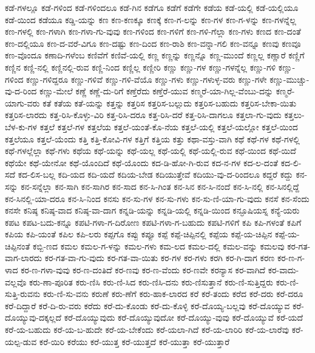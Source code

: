 {ಕಡೆ-ಗಳಲ್ಲೂ
ಕಡೆ-ಗಳಿಂದ
ಕಡೆ-ಗಳಿಂದಲೂ
ಕಡೆ-ಗಿನ
ಕಡೆಗೂ
ಕಡೆಗೆ
ಕಡೆಗೇ
ಕಡೆಯ
ಕಡೆ-ಯಲ್ಲಿ
ಕಡೆ-ಯಲ್ಲಿಯೂ
ಕಡೆ-ಯಿಂದ
ಕಡೆಯೂ
ಕಡ್ಡಿ-ಯನ್ನು
ಕಣ
ಕಣ-ಕಣಕ್ಕೂ
ಕಣಕ್ಕೆ
ಕಣ-ಗ-ಲನ್ನು
ಕಣ-ಗಳ
ಕಣ-ಗ-ಳನ್ನು
ಕಣ-ಗಳನ್ನೆಲ್ಲ
ಕಣ-ಗಳಲ್ಲಿ
ಕಣ-ಗಳಾಗಿ
ಕಣ-ಗಳಾ-ಗು-ವುವು
ಕಣ-ಗಳಿಂದ
ಕಣ-ಗಳಿಗೆ
ಕಣ-ಗಳಿ-ಗೆಲ್ಲಾ
ಕಣ-ಗಳು
ಕಣದ
ಕಣ-ದಂತೆ
ಕಣ-ದಲ್ಲಿಯೂ
ಕಣ-ದ-ವರೆ-ವಿಗೂ
ಕಣ-ದಷ್ಟು
ಕಣ-ದಿಂದ
ಕಣ-ರಾಶಿ
ಕಣ-ವನ್ನಾ-ಗಲಿ
ಕಣ-ವನ್ನೂ
ಕಣವು
ಕಣವೂ
ಕಣ-ವೊಂದೂ
ಕಣಾದಿ-ಗಳೆಂಬ
ಕಣಿವೆಗೆ
ಕಣಿವೆ-ಯಲ್ಲಿ
ಕಣ್ಣ
ಕಣ್ಣನ್ನು
ಕಣ್ಣನ್ನೊ
ಕಣ್ಣ-ಮುಂದೆ
ಕಣ್ಣಲ್ಲ
ಕಣ್ಣಾರೆ
ಕಣ್ಣಿಗೆ
ಕಣ್ಣಿನ
ಕಣ್ಣಿ-ನಲ್ಲಿ
ಕಣ್ಣಿನಲ್ಲಿ-ರುವ
ಕಣ್ಣಿ-ನಿಂದ
ಕಣ್ಣಿಲ್ಲ
ಕಣ್ಣೀರಿ
ಕಣ್ಣು
ಕಣ್ಣು-ಗಳ
ಕಣ್ಣು-ಗಳನ್ನೆಲ್ಲ
ಕಣ್ಣು-ಗಳಿ
ಕಣ್ಣು-ಗಳಿಂದ
ಕಣ್ಣು-ಗಳಿದ್ದರೂ
ಕಣ್ಣು-ಗಳಿವೆ
ಕಣ್ಣು-ಗಳಿ-ವೆಯೊ
ಕಣ್ಣು-ಗಳು
ಕಣ್ಣು-ಗಳುಳ್ಳ-ವರು
ಕಣ್ಣು-ಗಳೇ
ಕಣ್ಣು-ಮುಚ್ಚು-ವು-ದ-ರಿಂದ
ಕಣ್ಣು-ಮೇಲೆ
ಕಣ್ಣೆ
ಕಣ್ಣೆ-ದು-ರಿಗೆ
ಕಣ್ತೆರೆದು
ಕಣ್ತೆರೆ-ಯುವ
ಕಣ್ಮರೆ-ಯಾ-ಗಿಲ್ಲ-ವೆಂಬು-ದನ್ನು
ಕಣ್ಮರೆ-ಯಾಗು-ವರು
ಕತೆ
ಕತೆಯ
ಕತೆ-ಯನ್ನು
ಕತ್ತನ್ನು
ಕತ್ತರಿಸ
ಕತ್ತರಿಸ-ಬಲ್ಲುದು
ಕತ್ತರಿಸ-ಬಹುದು
ಕತ್ತರಿಸ-ಬೇಕಾ-ಯಿತು
ಕತ್ತರಿಸ-ಲಾರದು
ಕತ್ತ-ರಿಸಿ-ಕೊಳ್ಳು-ವಿರಿ
ಕತ್ತ-ರಿಸಿ-ದರೂ
ಕತ್ತ-ರಿಸಿ-ದರೆ
ಕತ್ತ-ರಿಸಿ-ದಾಗಲೂ
ಕತ್ತಲಾ-ಗು-ವುದು
ಕತ್ತಲು-ಬೆಳ-ಕು-ಗಳ
ಕತ್ತಲೆ
ಕತ್ತಲೆ-ಗಳ
ಕತ್ತಲೆಯ
ಕತ್ತಲೆ-ಯಂತೆ-ಕೊ-ನೆಯ
ಕತ್ತಲೆ-ಯಲ್ಲಿ
ಕತ್ತಲೆ-ಯಲ್ಲೋ
ಕತ್ತಲೆ-ಯಿಂದ
ಕತ್ತಲೆಯೂ
ಕತ್ತಲೆ-ಯೆಂದು
ಕತ್ತಿ
ಕತ್ತಿ-ಕೋವಿ-ಗಳ
ಕತ್ತಿಗೆ
ಕತ್ತಿಯ
ಕತ್ತು
ಕಥಾ-ವಸ್ತು-ವಾಗಿ
ಕಥೆ
ಕಥೆ-ಗಳ
ಕಥೆ-ಗಳಲ್ಲಿ
ಕಥೆ-ಗಳಲ್ಲೆಲ್ಲಾ
ಕಥೆ-ಗಳು
ಕಥೆಯ
ಕಥೆ-ಯನ್ನು
ಕಥೆ-ಯಲ್ಲ
ಕಥೆ-ಯಲ್ಲಿ
ಕಥೆ-ಯಲ್ಲಿ-ರುವ
ಕಥೆ-ಯಿಂದ
ಕಥೆ-ಯಿದೆ
ಕಥೆಯೇ
ಕಥೆ-ಯೇನೋ
ಕಥೆ-ಯೊಂದಿದೆ
ಕಥೆ-ಯೊಂದು
ಕದ-ಡಿ-ಹೋ-ಗಿ-ರುವ
ಕದ-ನ-ಗಳ
ಕದ-ಲ-ದಂತೆ
ಕದ-ಲಿ-ಸದೆ
ಕದ-ಲಿಸ-ಬಲ್ಲ
ಕದಿ-ಯದ
ಕದಿ-ಯದೆ
ಕದಿಯ-ಬೇಡ
ಕದಿಯುತ್ತೇವೆ
ಕದಿಯು-ವು-ದ-ರಿಂದಲೂ
ಕದ್ದರೆ
ಕದ್ದು
ಕನ-ಸನ್ನು
ಕನ-ಸನ್ನೆಲ್ಲಾ
ಕನ-ಸಾಗಿ
ಕನ-ಸಾಗಿರ
ಕನ-ಸಾದ
ಕನ-ಸಿ-ಗಿಂತ
ಕನ-ಸಿನ
ಕನ-ಸಿ-ನಂದೆ
ಕನ-ಸಿ-ನಲ್ಲಿ
ಕನ-ಸಿನಲ್ಲಿದ್ದೆ
ಕನ-ಸಿನಲ್ಲಿ-ಯಾ-ದರೂ
ಕನ-ಸಿ-ನಿಂದ
ಕನಸು
ಕನ-ಸು-ಗಳ
ಕನ-ಸು-ಗಳು
ಕನ-ಸು-ಣಿ-ಯಾ-ಗು-ವುದು
ಕನಸೆ
ಕನ-ಸೆಂದು
ಕನಸೇ
ಕನಿಷ್ಠ
ಕನಿಷ್ಠ-ವಾದ
ಕನಿಷ್ಠ-ವಾ-ದಾಗ
ಕನ್ನಡಿ-ಯನ್ನು
ಕನ್ನಡಿ-ಯಲ್ಲಿ
ಕನ್ನಡಿ-ಯಿಂದ
ಕನ್ಫೂಷಿಯಸ್ನ
ಕನ್ಯೆ-ಯರು
ಕಪಟ
ಕಪಟ-ಬದು-ಕನ್ನೂ
ಕಪಟಿ-ಗಳಾ-ಗ-ದಿರೋಣ
ಕಪಟಿ-ಗಳಾ-ಗ-ಬಹುದು
ಕಪಟಿ-ಗಳಿಗೆ
ಕಪಿ
ಕಪಿ-ಗಳಂತೆ
ಕಪಿಗೆ
ಕಪಿಯ
ಕಪಿ-ಯಂತೆ
ಕಪಿಲ
ಕಪಿ-ಲರು
ಕಪ್ಪಗೊ
ಕಪ್ಪು
ಕಪ್ಪೂ
ಕಪ್ಪೆ
ಕಪ್ಪೆ-ಚಿಪ್ಪಿನಲ್ಲಿ
ಕಪ್ಪೆಯ
ಕಪ್ಪೆ-ಯ-ಚಿಪ್ಪಿನ
ಕಪ್ಪೆ-ಯ-ಚಿಪ್ಪಿನಂತೆ
ಕಬ್ಬಿ-ಣದ
ಕಮಲ
ಕಮಲ-ಗ-ಳನ್ನು
ಕಮಲ-ಗಳು
ಕಮ-ಲದ
ಕಮಲ-ದಲ್ಲಿ
ಕಮಲ-ವನ್ನು
ಕಮಲವು
ಕರ-ಗತ-ವಾಗ-ಲಾರದು
ಕರ-ಗತ-ವಾ-ಗು-ವುದು
ಕರ-ಗತ-ವಾ-ಯಿತು
ಕರ-ಗಳ
ಕರ-ಗಳು
ಕರಗಿ
ಕರ-ಗಿ-ದಾಗ
ಕರಣ
ಕರ-ಣ-ಗ-ಳಾದ
ಕರ-ಣ-ಗಳಾ-ವುವು
ಕರ-ಣ-ದಂತಿದೆ
ಕರ-ಣವು
ಕರ-ಣ-ವೆಂದು
ಕರ-ಣವೇ
ಕರನ್ಯಾಸ
ಕರ-ವಾಗಿದೆ
ಕರ-ವಾದು-ವಲ್ಲವೊ
ಕರು-ಣಾ-ಪೂರಿತ
ಕರು-ಣಿಸಿ
ಕರು-ಣಿ-ಸಿದ
ಕರು-ಣಿಸಿ-ದನು
ಕರು-ಣಿಸುತ್ತಾನೆ
ಕರು-ಣಿ-ಸುತ್ತಿದ್ದರು
ಕರು-ಣಿ-ಸುತ್ತಿ-ರುವನು
ಕರು-ಣಿ-ಸು-ವನು
ಕರುಣೆ
ಕರು-ಣೆಗೆ
ಕರು-ಹಾಕ-ಲಾರದ
ಕರೆ
ಕರೆ-ತಂದು
ಕರೆದ
ಕರೆ-ದರು
ಕರೆ-ದರೂ
ಕರೆ-ದಿದ್ದಾರೆ
ಕರೆ-ದಿ-ರು-ವರು
ಕರೆದು
ಕರೆ-ದು-ಕೊಂಡು
ಕರೆ-ದು-ಕೊಳ್ಳಿ
ಕರೆ-ದೊಯ್ಯ-ಬಲ್ಲವು
ಕರೆ-ದೊಯ್ಯುವ
ಕರೆ-ದೊಯ್ಯುವು-ದಕ್ಕಲ್ಲದೆ
ಕರೆ-ದೊಯ್ಯುವುದು
ಕರೆ-ದೊಯ್ಯುವುದೋ
ಕರೆ-ದೊಯ್ಯು-ವುವು
ಕರೆ-ದೊಯ್ಯುವೆ
ಕರೆ-ಯದೆ
ಕರೆ-ಯ-ಬಹುದು
ಕರೆ-ಯ-ಬ-ಹುದೇ
ಕರೆ-ಯ-ಬೇಕೆಂದು
ಕರೆ-ಯಲಾ-ಗಿದೆ
ಕರೆ-ಯ-ಲಾರಿರಿ
ಕರೆ-ಯ-ಲಾರೆವು
ಕರೆ-ಯಲ್ಪ-ಡುವ
ಕರೆ-ಯಿರಿ
ಕರೆಯು
ಕರೆ-ಯುತ್ತ
ಕರೆ-ಯುತ್ತದೆ
ಕರೆ-ಯುತ್ತಾ
ಕರೆ-ಯುತ್ತಾರೆ
}
